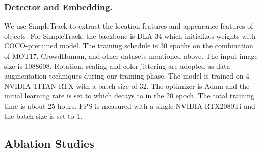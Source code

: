 \documentclass[runningheads]{llncs}
\begin{document}
\subsubsection{Detector and Embedding.}
We use SimpleTrack to extract the location features and appearance features of objects. For SimpleTrack, the backbone is DLA-34 which initializes weights with COCO-pretained model. The training schedule is 30 epochs on the combination of MOT17, CrowdHuman, and other datasets mentioned above. The input image size is 1088608. Rotation, scaling and color jittering are adopted as data augmentation techniques during our training phase. The model is trained on 4 NVIDIA TITAN RTX with a batch size of 32. The optimizer is Adam and the initial learning rate is set to  which decays to  in the 20 epoch. The total training time is about 25 hours. FPS is measured with a single NVIDIA RTX2080Ti and the batch size is set to 1.
\subsection{Ablation Studies}
\end{document}
